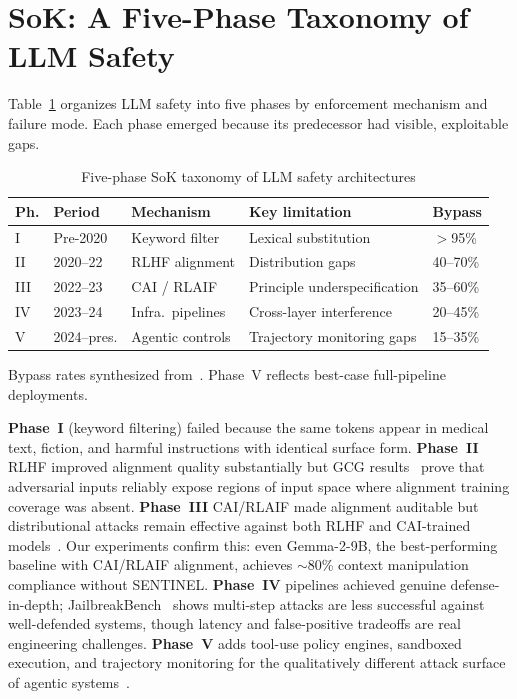 \documentclass[conference]{IEEEtran}
\begin{document}
\section{SoK: A Five-Phase Taxonomy of LLM Safety}
\label{sec:taxonomy}

Table~\ref{tab:taxonomy} organizes LLM safety into five phases by enforcement
mechanism and failure mode.
Each phase emerged because its predecessor had visible, exploitable gaps.

\begin{table}[t]
\centering
\caption{Five-phase SoK taxonomy of LLM safety architectures}
\label{tab:taxonomy}
\small
\renewcommand{\arraystretch}{1.22}
\begin{tabular}{@{}p{0.3cm}p{1.2cm}p{1.6cm}p{1.7cm}p{0.9cm}@{}}
\toprule
\rowcolor{headerblue!14}
\textbf{Ph.} & \textbf{Period} & \textbf{Mechanism} & \textbf{Key limitation} & \textbf{Bypass} \\
\midrule
I  & Pre-2020     & Keyword filter     & Lexical substitution      & $>$95\%   \\
\rowcolor{lightgray}
II & 2020--22     & RLHF alignment     & Distribution gaps         & 40--70\%  \\
III & 2022--23    & CAI / RLAIF        & Principle underspecification & 35--60\% \\
\rowcolor{lightgray}
IV & 2023--24     & Infra.\ pipelines  & Cross-layer interference  & 20--45\%  \\
V  & 2024--pres.  & Agentic controls   & Trajectory monitoring gaps & 15--35\% \\
\bottomrule
\end{tabular}
\vspace{2pt}
{\footnotesize 

Bypass rates synthesized from~\cite{mazeika2024harmbench,zou2023universal,
wei2023jailbroken,chu2024comprehensive}. Phase~V reflects best-case full-pipeline deployments.}
\end{table}

\textbf{Phase~I} (keyword filtering) failed because the same tokens appear in
medical text, fiction, and harmful instructions with identical surface form.
\textbf{Phase~II} RLHF improved alignment quality substantially but GCG
results~\cite{zou2023universal} prove that adversarial inputs reliably expose
regions of input space where alignment training coverage was absent.
\textbf{Phase~III} CAI/RLAIF made alignment auditable but distributional
attacks remain effective against both RLHF and CAI-trained
models~\cite{zou2023universal,anil2024many}.
Our experiments confirm this: even Gemma-2-9B, the best-performing baseline
with CAI/RLAIF alignment, achieves $\sim$80\% context manipulation compliance
without SENTINEL.
\textbf{Phase~IV} pipelines achieved genuine defense-in-depth;
JailbreakBench~\cite{chao2024jailbreakbench} shows multi-step attacks are less
successful against well-defended systems, though latency and false-positive
tradeoffs are real engineering challenges.
\textbf{Phase~V} adds tool-use policy engines, sandboxed execution, and
trajectory monitoring for the qualitatively different attack surface of
agentic systems~\cite{greshake2023not,ruan2024identifying}.
\end{document}
